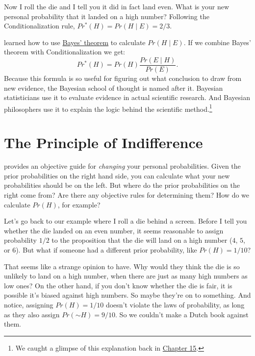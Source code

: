 \documentclass[justified]{tufte-book}
\newcommand{\given}{\mid}
\renewcommand{\neg}{\mathbin{\sim}}
\newcommand{\pr}{Pr}
\newcommand{\po}{Pr^*}
\theoremstyle{definition}
\theoremstyle{definition}
\theoremstyle{definition}
\theoremstyle{remark}
\begin{document}
Now I roll the die and I tell you it did in fact land even. What is your
new personal probability that it landed on a high number? Following the
Conditionalization rule, \(\po(H) = \pr(H \given E) = 2/3\).

 learned how to use
\protect\hyperlink{bayes-theorem}{Bayes' theorem} to calculate
\(\pr(H \given E)\). If we combine Bayes' theorem with
Conditionalization we get:
\[ \po(H) = \pr(H) \frac{\pr(E \given H)}{\pr(E)}. \] Because this
formula is so useful for figuring out what conclusion to draw from new
evidence, the Bayesian school of thought is named after it. Bayesian
statisticians use it to evaluate evidence in actual scientific research.
And Bayesian philosophers use it to explain the logic behind the
scientific method.\footnote{We caught a glimpse of this explanation back
  in \protect\hyperlink{bayesianism-1}{Chapter 15}.}

\hypertarget{the-principle-of-indifference}{%
\section{The Principle of
Indifference}\label{the-principle-of-indifference}}

 provides an objective guide for
\emph{changing} your personal probabilities. Given the prior
probabilities on the right hand side, you can calculate what your new
probabilities should be on the left. But where do the prior
probabilities on the right come from? Are there any objective rules for
determining them? How do we calculate \(\pr(H)\), for example?

Let's go back to our example where I roll a die behind a screen. Before
I tell you whether the die landed on an even number, it seems reasonable
to assign probability \(1/2\) to the proposition that the die will land
on a high number (\(4\), \(5\), or \(6\)). But what if someone had a
different prior probability, like \(\pr(H) = 1/10\)?

That seems like a strange opinion to have. Why would they think the die
is so unlikely to land on a high number, when there are just as many
high numbers as low ones? On the other hand, if you don't know whether
the die is fair, it is possible it's biased against high numbers. So
maybe they're on to something. And notice, assigning \(\pr(H) = 1/10\)
doesn't violate the laws of probability, as long as they also assign
\(\pr(\neg H) = 9/10\). So we couldn't make a Dutch book against them.
\end{document}
